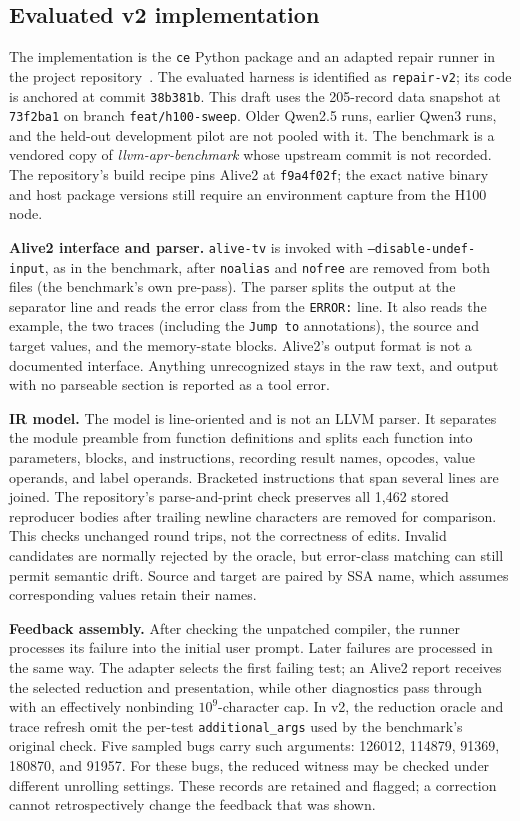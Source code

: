 \documentclass[conference]{IEEEtran}
\newcommand{\cn}[1]{\texttt{#1}}   %
\begin{document}
\subsection{Evaluated v2 implementation}

The implementation is the \texttt{ce} Python package and an adapted repair runner in the project repository~\cite{betterCompiler2026}. The evaluated harness is identified as \cn{repair-v2}; its code is anchored at commit \texttt{38b381b}. This draft uses the 205-record data snapshot at \texttt{73f2ba1} on branch \texttt{feat/h100-sweep}. Older Qwen2.5 runs, earlier Qwen3 runs, and the held-out development pilot are not pooled with it. The benchmark is a vendored copy of \emph{llvm-apr-benchmark} whose upstream commit is not recorded. The repository's build recipe pins Alive2 at \texttt{f9a4f02f}; the exact native binary and host package versions still require an environment capture from the H100 node.

\textbf{Alive2 interface and parser.} \texttt{alive-tv} is invoked with \texttt{--disable-undef-input}, as in the benchmark, after \texttt{noalias} and \texttt{nofree} are removed from both files (the benchmark's own pre-pass). The parser splits the output at the separator line and reads the error class from the \texttt{ERROR:} line. It also reads the example, the two traces (including the \texttt{Jump to} annotations), the source and target values, and the memory-state blocks. Alive2's output format is not a documented interface. Anything unrecognized stays in the raw text, and output with no parseable section is reported as a tool error.

\textbf{IR model.} The model is line-oriented and is not an LLVM parser. It separates the module preamble from function definitions and splits each function into parameters, blocks, and instructions, recording result names, opcodes, value operands, and label operands. Bracketed instructions that span several lines are joined. The repository's parse-and-print check preserves all 1{,}462 stored reproducer bodies after trailing newline characters are removed for comparison. This checks unchanged round trips, not the correctness of edits. Invalid candidates are normally rejected by the oracle, but error-class matching can still permit semantic drift. Source and target are paired by SSA name, which assumes corresponding values retain their names.

\textbf{Feedback assembly.} After checking the unpatched compiler, the runner processes its failure into the initial user prompt. Later failures are processed in the same way. The adapter selects the first failing test; an Alive2 report receives the selected reduction and presentation, while other diagnostics pass through with an effectively nonbinding $10^9$-character cap. In v2, the reduction oracle and trace refresh omit the per-test \texttt{additional\_args} used by the benchmark's original check. Five sampled bugs carry such arguments: 126012, 114879, 91369, 180870, and 91957. For these bugs, the reduced witness may be checked under different unrolling settings. These records are retained and flagged; a correction cannot retrospectively change the feedback that was shown.
\end{document}
